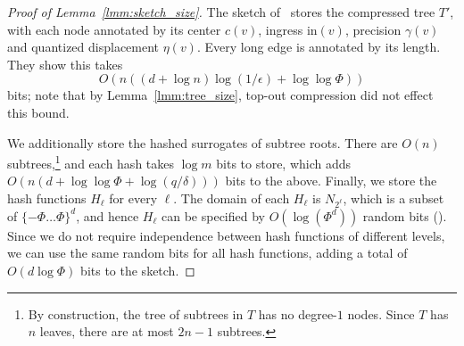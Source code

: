 \begin{proof}[Proof of Lemma~\ref{lmm:sketch_size}]
The sketch of~\cite{indyk2017near} stores the compressed tree $T'$, with each node annotated by its center $c(v)$, ingress $\mathrm{in}(v)$, precision $\gamma(v)$ and quantized displacement $\eta(v)$.
Every long edge is annotated by its length.
They show this takes
\[ O\left( n\left((d+\log n)\log(1/\epsilon) + \log\log\Phi\right)\right) \]
bits;
note that by Lemma~\ref{lmm:tree_size}, top-out compression did not effect this bound.

We additionally store the hashed surrogates of subtree roots.
There are $O(n)$ subtrees,\footnote{By construction, the tree of subtrees in $T$ has no degree-$1$ nodes. Since $T$ has $n$ leaves, there are at most $2n-1$ subtrees.} and each hash takes $\log m$ bits to store, which adds $O(n(d+\log\log\Phi+\log(q/\delta)))$ bits to the above.
Finally, we store the hash functions $H_\ell$ for every $\ell$.
The domain of each $H_\ell$ is $N_{2^\ell}$, which is a subset of $\{-\Phi \ldots \Phi\}^d$, and hence $H_\ell$ can be specified by $O(\log(\Phi^d))$ random bits (\cite{carter1979universal}).
Since we do not require independence between hash functions of different levels, we can use the same random bits for all hash functions, adding a total of $O(d\log\Phi)$ bits to the sketch.
\end{proof}

